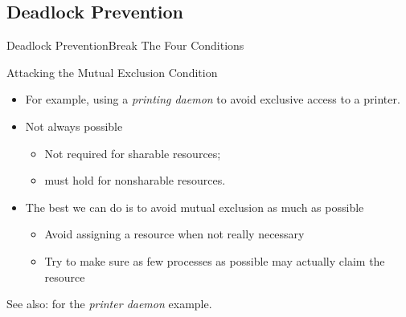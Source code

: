 \subsection{Deadlock Prevention}
\label{sec:deadlock-prevention}

\begin{frame}{Deadlock Prevention}{Break The Four Conditions}
  \begin{block}{Attacking the Mutual Exclusion Condition}
    \begin{itemize}
    \item For example, using a \emph{printing daemon} to avoid exclusive access to a printer.
    \item[\textcolor{red}{🙁}] Not always possible
      \begin{itemize}
      \item Not required for sharable resources;
      \item must hold for nonsharable resources.
      \end{itemize}
    \item The best we can do is to avoid mutual exclusion as much as possible
      \begin{itemize}
      \item Avoid assigning a resource when not really necessary
      \item Try to make sure as few processes as possible may actually claim the resource
      \end{itemize}
    \end{itemize}
  \end{block}
\end{frame}

See also:  for the \emph{printer daemon} example.

